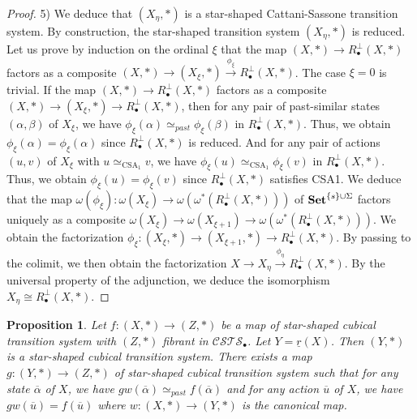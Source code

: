 \documentclass[a4paper,12pt]{amsart}
\newtheorem{prop}[thm]{Proposition}
\begin{document}
\begin{proof}
5) We deduce that $(X_\eta,*)$ is a star-shaped Cattani-Sassone
transition system. By construction, the star-shaped transition system
$(X_\eta,*)$ is reduced. Let us prove by induction on the ordinal
$\xi$ that the map $(X,*)\to R_\bullet^\perp(X,*)$ factors as a
composite $(X,*)\to (X_\xi,*) \stackrel{\phi_\xi}\to
R_\bullet^\perp(X,*)$. The case $\xi=0$ is trivial. If the map
$(X,*)\to R_\bullet^\perp(X,*)$ factors as a composite $(X,*)\to
(X_\xi,*) \to R_\bullet^\perp(X,*)$, then for any pair of past-similar
states $(\alpha,\beta)$ of $X_\xi$, we have $\phi_\xi(\alpha)
\simeq_{past} \phi_\xi(\beta)$ in $R_\bullet^\perp(X,*)$. Thus, we
obtain $\phi_\xi(\alpha) = \phi_\xi(\alpha)$ since
$R_\bullet^\perp(X,*)$ is reduced. And for any pair of actions $(u,v)$
of $X_\xi$ with $u\simeq_{\operatorname{CSA}_1} v$, we have $\phi_\xi(u)
\simeq_{\operatorname{CSA}_1} \phi_\xi(v)$ in $R_\bullet^\perp(X,*)$. Thus, we
obtain $\phi_\xi(u) = \phi_\xi(v)$ since $R_\bullet^\perp(X,*)$
satisfies CSA1. We deduce that the map $\omega(\phi_\xi):\omega(X_\xi)
\to \omega(\omega^*(R_\bullet^\perp(X,*)))$ of ${{{\rm{\mathbf{{Set}}}}}}^{\{s\}\cup
  \Sigma}$ factors uniquely as a composite $\omega(X_\xi) \to
\omega(X_{\xi+1})\to \omega(\omega^*(R_\bullet^\perp(X,*)))$. We
obtain the factorization $\phi_\xi : (X_\xi,*) \to (X_{\xi+1},*) \to
R_\bullet^\perp(X,*)$. By passing to the colimit, we then obtain the
factorization $X \longrightarrow X_\eta \stackrel{\phi_\eta}
\longrightarrow R_\bullet^\perp(X,*)$.  By the universal property of
the adjunction, we deduce the isomorphism $X_\eta {\cong}
R_\bullet^\perp(X,*)$.  \end{proof}

\begin{prop} \label{onto-by-step} Let $f:(X,*) \to (Z,*)$ be a map of
star-shaped cubical transition system with $(Z,*)$ fibrant in
${\mathcal{C\!S\!T\!S}}_\bullet$. Let $Y=\underline{r}(X)$. Then $(Y,*)$ is a
star-shaped cubical transition system. There exists a map $g:(Y,*)\to
(Z,*)$ of star-shaped cubical transition system such that for any
state $\overline{\alpha}$ of $X$, we have
$gw(\overline{\alpha})\simeq_{past} f(\overline{\alpha})$ and for any
action $\overline{u}$ of $X$, we have $gw(\overline{u}) =
f(\overline{u})$ where $w:(X,*) \to (Y,*)$ is the canonical map. \end{prop}
\end{document}
